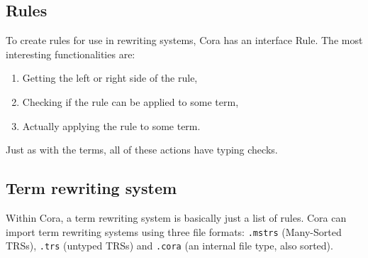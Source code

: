\subsection{Rules}
To create rules for use in rewriting systems, Cora has an interface Rule. The most interesting functionalities are: 
\begin{enumerate}
    \itemsep0em
    \item Getting the left or right side of the rule,
    \item Checking if the rule can be applied to some term,
    \item Actually applying the rule to some term.
\end{enumerate}
Just as with the terms, all of these actions have typing checks. 
\subsection{Term rewriting system}
Within Cora, a term rewriting system is basically just a list of rules. Cora can import term rewriting systems using three file formats: \texttt{.mstrs} (Many-Sorted TRSs), \texttt{.trs} (untyped TRSs) and \texttt{.cora} (an internal file type, also sorted). 